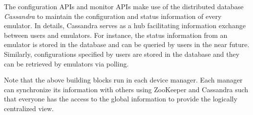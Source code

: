 \documentclass[conference]{IEEEtranl}
\begin{document}
	The configuration APIs and monitor APIs make use of the distributed database \textit{Cassandra} \cite{lakshman2010cassandra} to maintain the configuration and status information of every emulator. In details, Cassandra serves as a hub facilitating information exchange between users and emulators. For instance, the status information from an emulator is stored in the database and can be queried by users in the near future. Similarly,
	configurations specified by users are stored in the database and they can be retrieved by emulators via polling.

	Note that the above building blocks run in each device manager. Each manager can synchronize its information with others using ZooKeeper and Cassandra such that everyone has the access to the global information to provide the logically centralized view. 



\end{document}
